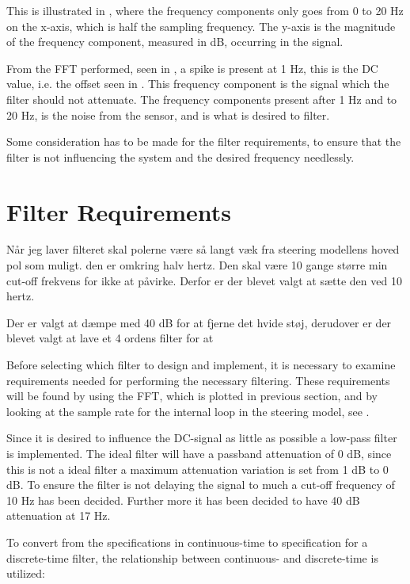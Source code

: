 This is illustrated in , where the frequency components only goes from 0 to 20 Hz on the x-axis, which is half the sampling frequency. The y-axis is the magnitude of the frequency component, measured in \si{dB}, occurring in the signal.

From the FFT performed, seen in , a spike is present at 1 \si{Hz}, this is the DC value, i.e. the offset seen in . This frequency component is the signal which the filter should not attenuate. The frequency components present after 1 Hz and to 20 Hz, is the noise from the sensor, and is what is desired to filter. 

Some consideration has to be made for the filter requirements, to ensure that the filter is not influencing the system and the desired frequency needlessly.

\section{Filter Requirements} \label{sec:FilterRequirements}

Når jeg laver filteret skal polerne være så langt væk fra steering modellens hoved pol som muligt. den er omkring halv hertz. Den skal være 10 gange større min cut-off frekvens for ikke at påvirke. Derfor er der blevet valgt at sætte den ved 10 hertz. 

Der er valgt at dæmpe med 40 \si{dB} for at fjerne det hvide støj, derudover er der blevet valgt at lave et 4 ordens filter for at


Before selecting which filter to design and implement, it is necessary to examine requirements needed for performing the necessary filtering. These requirements will be found by using the FFT, which is plotted in previous section, and by looking at the sample rate for the internal loop in the steering model, see . 

Since it is desired to influence the DC-signal as little as possible a low-pass filter is implemented. The ideal filter will have a passband attenuation of 0 \si{dB}, since this is not a ideal filter a maximum attenuation variation is set from 1 \si{dB} to 0 \si{dB}. To ensure the filter is not delaying the signal to much a cut-off frequency of 10 \si{Hz} has been decided. Further more it has been decided to have 40 \si{dB} attenuation at 17 \si{Hz}.
 
To convert from the specifications in continuous-time to specification for a discrete-time filter, the relationship between continuous- and discrete-time is utilized:

